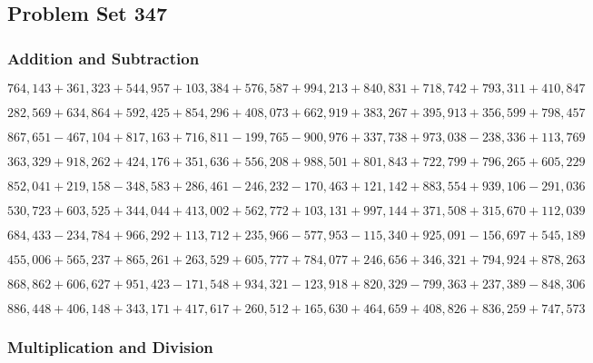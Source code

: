 \hypertarget{problem-set-347}{%
\subsection{Problem Set 347}\label{problem-set-347}}

\hypertarget{addition-and-subtraction}{%
\subsubsection{Addition and
Subtraction}\label{addition-and-subtraction}}

\(764,143+361,323+544,957+103,384+576,587+994,213+840,831+718,742+793,311+410,847\)

\(282,569+634,864+592,425+854,296+408,073+662,919+383,267+395,913+356,599+798,457\)

\(867,651-467,104+817,163+716,811-199,765-900,976+337,738+973,038-238,336+113,769\)

\(363,329+918,262+424,176+351,636+556,208+988,501+801,843+722,799+796,265+605,229\)

\(852,041+219,158-348,583+286,461-246,232-170,463+121,142+883,554+939,106-291,036\)

\(530,723+603,525+344,044+413,002+562,772+103,131+997,144+371,508+315,670+112,039\)

\(684,433-234,784+966,292+113,712+235,966-577,953-115,340+925,091-156,697+545,189\)

\(455,006+565,237+865,261+263,529+605,777+784,077+246,656+346,321+794,924+878,263\)

\(868,862+606,627+951,423-171,548+934,321-123,918+820,329-799,363+237,389-848,306\)

\(886,448+406,148+343,171+417,617+260,512+165,630+464,659+408,826+836,259+747,573\)

\hypertarget{multiplication-and-division}{%
\subsubsection{Multiplication and
Division}\label{multiplication-and-division}}


